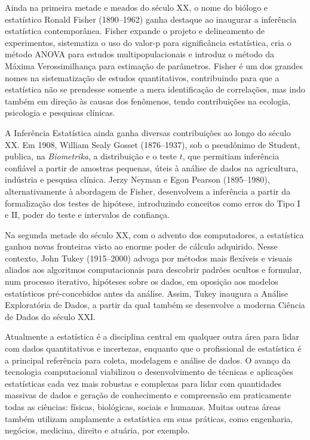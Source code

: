 Ainda na primeira metade e meados do século XX, o nome do biólogo e estatístico Ronald
Fisher (1890--1962) ganha destaque ao inaugurar a inferência estatística contemporânea.
Fisher expande o projeto e delineamento de experimentos, sistematiza o uso do valor-p para
significância estatística, cria o método ANOVA para estudos multipopulacionais
e introduz o método da Máxima Verossimilhança para estimação de parâmetros.
Fisher é um dos grandes nomes na sistematização de estudos quantitativos, contribuindo
para que a estatística não se prendesse somente a mera identificação de correlações, mas
indo também em direção às causas dos fenômenos, tendo contribuições na ecologia,
psicologia e pesquisas clínicas.

A Inferência Estatística ainda ganha diversas contribuições ao longo do século XX.
Em 1908, William Sealy Gosset (1876--1937), sob o pseudônimo de Student, publica, na
\textit{Biometrika}, a distribuição e o teste $t$, que permitiam inferência confiável a
partir de amostras pequenas, úteis à análise de dados na agricultura, indústria e
pesquisa clínica.
Jerzy Neyman e Egon Pearson (1895--1980), alternativamente à abordagem de Fisher, desenvolvem a
inferência a partir da formalização dos testes de hipótese, introduzindo conceitos
como erros do Tipo I e II, poder do teste e intervalos de confiança.

Na segunda metade do século XX, com o advento dos computadores, a estatística ganhou
novas fronteiras visto ao enorme poder de cálculo adquirido.
Nesse contexto, John Tukey (1915--2000) advoga por métodos mais flexíveis e visuais aliados aos
algoritmos computacionais para descobrir padrões ocultos e formular, num processo
iterativo, hipóteses sobre os dados, em oposição aos modelos estatísticos pré-concebidos
antes da análise.
Assim, Tukey inaugura a Análise Exploratória de Dados, a partir da qual também se
desenvolve a moderna Ciência de Dados do século XXI.

Atualmente a estatística é a disciplina central em qualquer outra área para lidar com
dados quantitativos e incertezas, enquanto que o profissional de estatística é a principal
referência para coleta, modelagem e análise de dados.
O avanço da tecnologia computacional viabilizou o desenvolvimento de técnicas e aplicações
estatísticas cada vez mais robustas e complexas para lidar com quantidades massivas de
dados e geração de conhecimento e compreensão em praticamente todas as ciências: físicas,
biológicas, sociais e humanas.
Muitas outras áreas também utilizam amplamente a estatística em suas práticas, como
engenharia, negócios, medicina, direito e atuária, por exemplo.

